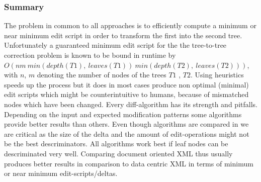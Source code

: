 


\subsubsection{Summary}
The problem in common to all approaches is to efficiently compute a minimum or near minimum edit script in order to transform the first into the second tree. Unfortunately a guaranteed minimum edit script for the the tree-to-tree correction problem is known to be bound in runtime by \\$O(nm\ min(depth(T1),\ leaves(T1))\ min(depth(T2),\ leaves(T2)))$, with $n$, $m$ denoting the number of nodes of the trees $T1$ , $T2$. Using heuristics speeds up the process but it does in most cases produce non optimal (minimal) edit scripts which might be counterintuitive to humans, because of mismatched nodes which have been changed. Every diff-algorithm has its strength and pitfalls. Depending on the input and expected modification patterns some algorithms provide better results than others. Even though algorithms are compared in \cite{ronnau2009efficient} we are critical as the size of the delta and the amount of edit-operations might not be the best descriminators. All algorithms work best if leaf nodes can be descriminated very well. Comparing document oriented XML thus usually produces better results in comparison to data centric XML in terms of minimum or near minimum edit-scripts/deltas.

